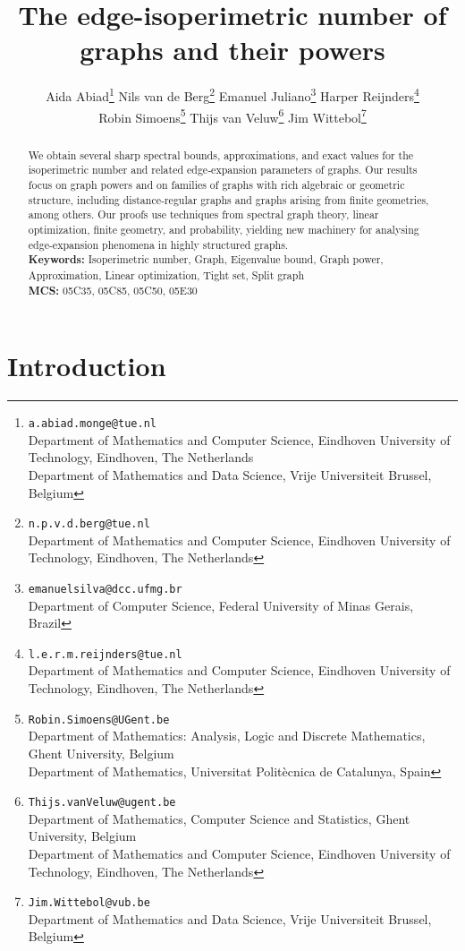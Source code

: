 \documentclass[a4paper,11pt]{article}
\title{The edge-isoperimetric number of graphs and their powers}
\author{Aida Abiad\thanks{\texttt{a.abiad.monge@tue.nl}\\
Department of Mathematics and Computer Science, Eindhoven University of Technology, Eindhoven, The Netherlands\\
Department of Mathematics and Data Science, Vrije Universiteit Brussel, Belgium}
\quad
Nils van de Berg\thanks{\texttt{n.p.v.d.berg@tue.nl}\\
Department of Mathematics and Computer Science, Eindhoven University of Technology, Eindhoven, The Netherlands}
\quad
Emanuel Juliano\thanks{\texttt{emanuelsilva@dcc.ufmg.br}\\
Department of Computer Science, Federal University of Minas Gerais, Brazil}
\quad
Harper Reijnders\thanks{\texttt{l.e.r.m.reijnders@tue.nl}\\
Department of Mathematics and Computer Science, Eindhoven University of Technology, Eindhoven, The Netherlands}
\\
Robin Simoens\thanks{\texttt{Robin.Simoens@UGent.be}\\
Department of Mathematics: Analysis, Logic and Discrete Mathematics, Ghent University, Belgium\\
Department of Mathematics, Universitat Politècnica de Catalunya, Spain}
\quad
Thijs van Veluw\thanks{\texttt{Thijs.vanVeluw@ugent.be}\\
Department of Mathematics, Computer Science and Statistics, Ghent University, Belgium\\
Department of Mathematics and Computer Science, Eindhoven University of Technology, Eindhoven, The Netherlands}
\quad
Jim Wittebol\thanks{\texttt{Jim.Wittebol@vub.be}\\
Department of Mathematics and Data Science, Vrije Universiteit Brussel, Belgium}}
\date{}
\theoremstyle{definition}
\begin{document}
\maketitle

\begin{abstract}
We obtain several sharp spectral bounds, approximations, and exact values for the isoperimetric number and related edge‑expansion parameters of graphs. Our results focus on graph powers and on families of graphs with rich algebraic or geometric structure, including distance‑regular graphs and graphs arising from finite geometries, among others. Our proofs use techniques from spectral graph theory, linear optimization, finite geometry, and probability, yielding new machinery for analysing edge-expansion phenomena in highly structured graphs.\\


\noindent   \textbf{Keywords:} Isoperimetric number, Graph, Eigenvalue bound, Graph power, Approximation, Linear optimization, Tight set, Split graph\\
\noindent   \textbf{MCS:} 05C35, 05C85, 05C50, 05E30
\end{abstract}



 

\section{Introduction}
\end{document}
